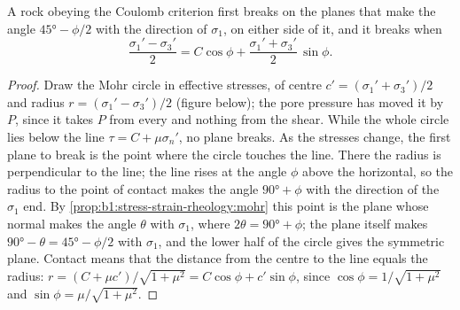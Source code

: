 \begin{theorem}\label{thm:b1:stress-strain-rheology:failure-angle}
A rock obeying the Coulomb criterion first breaks on the planes that make the
angle $\ang{45} - \phi/2$ with the direction of $\sigma_1$, on either side of
it, and it breaks when
\[
  \frac{\sigma_1' - \sigma_3'}{2} = C\cos\phi + \frac{\sigma_1' + \sigma_3'}{2}\,\sin\phi .
\]
\end{theorem}

\begin{proof}
Draw the Mohr circle in effective stresses, of centre $c' =
(\sigma_1'+\sigma_3')/2$ and radius $r = (\sigma_1'-\sigma_3')/2$
(figure below); the pore pressure has moved it
by $P$, since it takes $P$ from every  and nothing from the
shear. While the whole circle lies below the line $\tau = C + \mu\sigma_n'$,
no plane breaks. As the stresses change, the first plane to break is the
point where the circle touches the line. There the radius is perpendicular to
the line; the line rises at the angle $\phi$ above the horizontal, so the
radius to the point of contact makes the angle $\ang{90} + \phi$ with the
direction of the $\sigma_1$ end. By \cref{prop:b1:stress-strain-rheology:mohr}
this point is the plane whose normal makes the angle $\theta$ with $\sigma_1$,
where $2\theta = \ang{90} + \phi$; the plane itself makes
$\ang{90} - \theta = \ang{45} - \phi/2$ with $\sigma_1$, and the lower half of
the circle gives the symmetric plane. Contact means that the distance from
the centre to the line equals the radius:
$r = (C + \mu c')/\sqrt{1+\mu^2} = C\cos\phi + c'\sin\phi$, since
$\cos\phi = 1/\sqrt{1+\mu^2}$ and $\sin\phi = \mu/\sqrt{1+\mu^2}$.
\end{proof}

